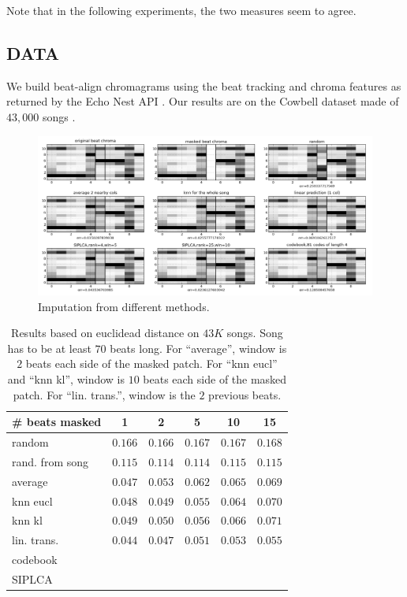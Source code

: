 \documentclass{article}
\begin{document}
Note that in the following experiments, the two measures seem to agree.

\subsection{DATA}
\label{ssec:data}
We build beat-align chromagrams using the beat tracking and chroma features as
returned by the Echo Nest API \cite{EchoNest}. Our results are on the Cowbell
dataset made of $43,000$ songs \cite{Bertin-Mahieux2010a}.

\begin{figure}[t]
\begin{center}
\includegraphics[width=.9\columnwidth]{imputation}
\end{center}
\caption{Imputation from different methods.}
\label{fig:imputation}
\end{figure}

\begin{table}[t]
\begin{center}
\begin{tabular}{l|c|c|c|c|c|}
\# beats masked & 1 & 2 & 5 & 10 & 15 \\ \hline \hline
random & $0.166$ & $0.166$ & $0.167$ & $0.167$ & $0.168$  \\
rand. from song & $0.115$ & $0.114$ & $0.114$ & $0.115$ & $0.115$  \\
average & $0.047$ & $0.053$ & $0.062$ & $0.065$ & $\mathbf{0.069}$ \\
knn eucl & $0.048$ & $0.049$ & $0.055$ & $0.064$ &  $0.070$ \\
knn kl & $0.049$ & $0.050$ & $0.056$ & $0.066$ &  $0.071$ \\
lin. trans. & $\mathbf{0.044}$ & $\mathbf{0.047}$ & $\mathbf{0.051}$ & $\mathbf{0.053}$ & $\mathbf{0.055}$ \\
codebook & & & & &  \\
SIPLCA & & & & &  \\ \hline
\end{tabular}
\caption{Results based on euclidead distance on $43K$ songs.
Song has to be at least $70$ beats long. 
For ``average'', window is $2$ beats each side of the masked patch.
For ``knn eucl'' and ``knn kl'', window is $10$ beats each side of the masked patch.
For ``lin. trans.'', window is the $2$ previous beats.}
\label{tab:reseucl}
\end{center}
\end{table}
\end{document}
